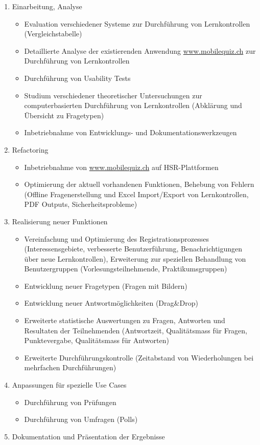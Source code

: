 \begin{enumerate}
	\item Einarbeitung, Analyse
	\begin{itemize}
		  \item Evaluation verschiedener Systeme zur Durchführung von Lernkontrollen (Vergleichstabelle)
		  \item Detaillierte Analyse der existierenden Anwendung \url{www.mobilequiz.ch} zur Durchführung von Lernkontrollen 
		  \item Durchführung von Usability Tests
		  \item Studium verschiedener theoretischer Untersuchungen zur computerbasierten Durchführung von Lernkontrollen (Abklärung und Übersicht zu Fragetypen)
		  \item Inbetriebnahme von Entwicklungs- und Dokumentationswerkzeugen
	\end{itemize}

	\item Refactoring
	\begin{itemize}
		  \item Inbetriebnahme von \url{www.mobilequiz.ch} auf HSR-Plattformen
		  \item Optimierung der aktuell vorhandenen Funktionen, Behebung von Fehlern (Offline Fragenerstellung und Excel Import/Export von Lernkontrollen, PDF Outputs, Sicherheitsprobleme)
	\end{itemize}

	\item Realisierung neuer Funktionen
	\begin{itemize}
		  \item Vereinfachung und Optimierung des Registrationsprozesses (Interessensgebiete, verbesserte Benutzerführung, Benachrichtigungen über neue Lernkontrollen), Erweiterung zur speziellen Behandlung von Benutzergruppen (Vorlesungsteilnehmende, Praktikumsgruppen)
		  \item Entwicklung neuer Fragetypen (Fragen mit Bildern)
		  \item Entwicklung neuer Antwortmöglichkeiten (Drag\&Drop)
		  \item Erweiterte statistische Auswertungen zu Fragen, Antworten und Resultaten der Teilnehmenden (Antwortzeit, Qualitätsmass für Fragen, Punktevergabe, Qualitätsmass für Antworten) 
		  \item Erweiterte Durchführungskontrolle (Zeitabstand von Wiederholungen bei mehrfachen Durchführungen)
	\end{itemize}
	
	\item Anpassungen für spezielle Use Cases
	\begin{itemize}
		\item Durchführung von Prüfungen
		\item Durchführung von Umfragen (Polls)
	\end{itemize}

	\item Dokumentation und Präsentation der Ergebnisse
  
\end{enumerate}


